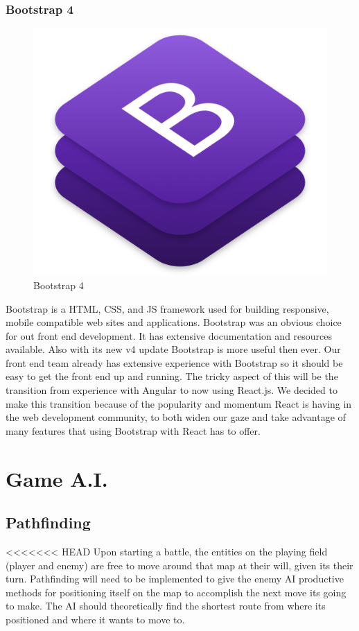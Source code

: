 \documentclass[12pt,a4paper]{report}
\begin{document}
			\subsubsection{Bootstrap 4}
			\begin{figure}
				\includegraphics[scale=0.1]{bootstrap4}
				\caption{Bootstrap 4}
				\label{Bootstrap 4}
			\end{figure}
			Bootstrap is a HTML, CSS, and JS framework used for building responsive, mobile compatible web sites and applications. Bootstrap was an obvious choice for out front end development. It has extensive documentation and resources available. Also with its new v4 update Bootstrap is more useful then ever. Our front end team already has extensive experience with Bootstrap so it should be easy to get the front end up and running. The tricky aspect of this will be the transition from experience with Angular to now using React.js. We decided to make this transition because of the popularity and momentum React is having in the web development community, to both widen our gaze and take advantage of many features that using Bootstrap with React has to offer.
			
	\section{Game A.I.}
		\subsection{Pathfinding}
<<<<<<< HEAD
		Upon starting a battle, the entities on the playing field (player and enemy) are free to move around that map at their will, given its their turn. Pathfinding will need to be implemented to give the enemy AI productive methods for positioning itself on the map to accomplish the next move its going to make. The AI should theoretically find the shortest route from where its positioned and where it wants to move to.
		
\end{document}
